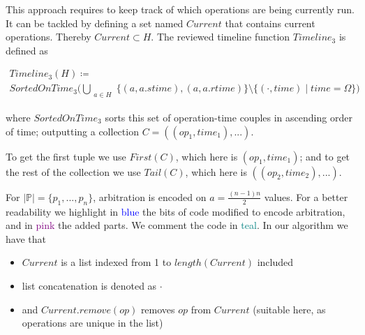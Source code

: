 \documentclass[12pt]{article}
\begin{document}
This approach requires to keep track of which operations are being currently run. It can be tackled by defining a set named $Current$ that contains current operations. Thereby $Current\subset H$. The reviewed timeline function $Timeline_3$ is defined as 


\begin{gather*}
Timeline_3(H) \coloneq \\
SortedOnTime_3\Big(
  \bigcup\limits_{\substack{a \in H}}
  \big\{(a, a.stime), (a,a.rtime)\big\}
  \setminus \{(\cdot,time)\mid time=\Omega\}
\Big)
\end{gather*}

where $SortedOnTime_3$ sorts this set of operation-time couples in ascending order of time; outputting a collection \mbox{$C=((op_1,time_1),...)$}.

To get the first tuple we use $First(C)$, which here is $(op_1,time_1)$; and to get the rest of the collection we use $Tail(C)$, which here is $((op_2,time_2),...)$.

For $|\mathbb{P}|=\{p_1,...,p_n\}$, arbitration is encoded on \mbox{$a=\frac{(n-1)n}{2}$} values. For a better readability we highlight in \textcolor{blue}{blue} the bits of code modified to encode arbitration, and in \textcolor{purple}{pink} the added parts. We comment the code in \textcolor{teal}{teal}. In our algorithm we have that

\begin{itemize}[label=$\ast$,itemsep=0pt,parsep=0pt]
	\item $Current$ is a list indexed from 1 to $length(Current)$ included
	\item list concatenation is denoted as $\cdot$
	\item and $Current.remove(op)$ removes $op$ from $Current$ (suitable here, as operations are unique in the list)
\end{itemize}

\vspace{1em}
\end{document}
